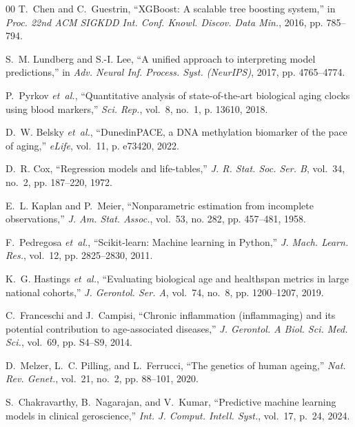 \documentclass[conference]{IEEEtran}
\begin{document}
\begin{thebibliography}{00}
T.~Chen and C.~Guestrin, ``XGBoost: A scalable tree boosting system,'' in \emph{Proc. 22nd ACM SIGKDD Int. Conf. Knowl. Discov. Data Min.}, 2016, pp. 785--794.

S.~M. Lundberg and S.-I. Lee, ``A unified approach to interpreting model predictions,'' in \emph{Adv. Neural Inf. Process. Syst. (NeurIPS)}, 2017, pp. 4765--4774.

P.~Pyrkov \emph{et~al.}, ``Quantitative analysis of state-of-the-art biological aging clocks using blood markers,'' \emph{Sci. Rep.}, vol.~8, no.~1, p. 13610, 2018.

D.~W. Belsky \emph{et~al.}, ``DunedinPACE, a DNA methylation biomarker of the pace of aging,'' \emph{eLife}, vol.~11, p. e73420, 2022.

D.~R. Cox, ``Regression models and life-tables,'' \emph{J. R. Stat. Soc. Ser. B}, vol.~34, no.~2, pp. 187--220, 1972.

E.~L. Kaplan and P.~Meier, ``Nonparametric estimation from incomplete observations,'' \emph{J. Am. Stat. Assoc.}, vol.~53, no. 282, pp. 457--481, 1958.

F.~Pedregosa \emph{et~al.}, ``Scikit-learn: Machine learning in Python,'' \emph{J. Mach. Learn. Res.}, vol.~12, pp. 2825--2830, 2011.

K.~G. Hastings \emph{et~al.}, ``Evaluating biological age and healthspan metrics in large national cohorts,'' \emph{J. Gerontol. Ser. A}, vol.~74, no.~8, pp. 1200--1207, 2019.

C.~Franceschi and J.~Campisi, ``Chronic inflammation (inflammaging) and its potential contribution to age-associated diseases,'' \emph{J. Gerontol. A Biol. Sci. Med. Sci.}, vol.~69, pp. S4--S9, 2014.

D.~Melzer, L.~C. Pilling, and L.~Ferrucci, ``The genetics of human ageing,'' \emph{Nat. Rev. Genet.}, vol.~21, no.~2, pp. 88--101, 2020.

S.~Chakravarthy, B.~Nagarajan, and V.~Kumar, ``Predictive machine learning models in clinical geroscience,'' \emph{Int. J. Comput. Intell. Syst.}, vol.~17, p.~24, 2024.

\end{thebibliography}
\end{document}
